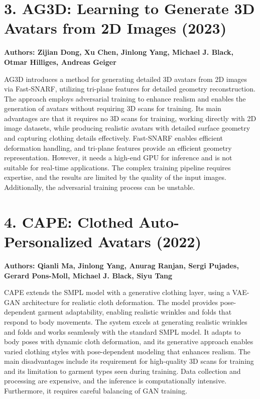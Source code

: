 \documentclass[12pt,a4paper,oneside]{report}
\begin{document}
\section*{3. AG3D: Learning to Generate 3D Avatars from 2D Images (2023)}

\textbf{Authors: Zijian Dong, Xu Chen, Jinlong Yang, Michael J. Black, Otmar Hilliges, Andreas Geiger}

AG3D introduces a method for generating detailed 3D avatars from 2D images via Fast-SNARF, utilizing tri-plane features for detailed geometry reconstruction. The approach employs adversarial training to enhance realism and enables the generation of avatars without requiring 3D scans for training. Its main advantages are that it requires no 3D scans for training, working directly with 2D image datasets, while producing realistic avatars with detailed surface geometry and capturing clothing details effectively. Fast-SNARF enables efficient deformation handling, and tri-plane features provide an efficient geometry representation. However, it needs a high-end GPU for inference and is not suitable for real-time applications. The complex training pipeline requires expertise, and the results are limited by the quality of the input images. Additionally, the adversarial training process can be unstable.

\section*{4. CAPE: Clothed Auto-Personalized Avatars (2022)}

\textbf{Authors: Qianli Ma, Jinlong Yang, Anurag Ranjan, Sergi Pujades, Gerard Pons-Moll, Michael J. Black, Siyu Tang}

CAPE extends the SMPL model with a generative clothing layer, using a VAE-GAN architecture for realistic cloth deformation. The model provides pose-dependent garment adaptability, enabling realistic wrinkles and folds that respond to body movements. The system excels at generating realistic wrinkles and folds and works seamlessly with the standard SMPL model. It adapts to body poses with dynamic cloth deformation, and its generative approach enables varied clothing styles with pose-dependent modeling that enhances realism. The main disadvantages include its requirement for high-quality 3D scans for training and its limitation to garment types seen during training. Data collection and processing are expensive, and the inference is computationally intensive. Furthermore, it requires careful balancing of GAN training.
\end{document}
